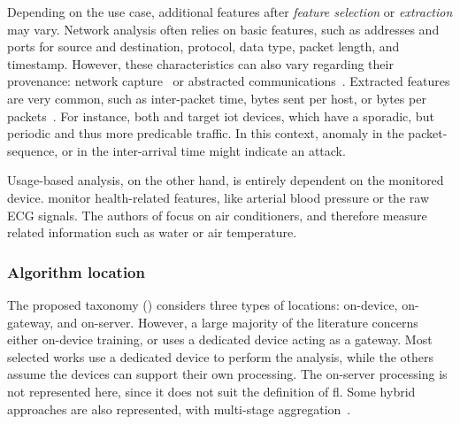 Depending on the use case, additional features after \emph{feature selection} or \emph{extraction} may vary.
Network analysis often relies on basic features, such as addresses and ports for source and destination, protocol, data type, packet length, and timestamp.
However, these characteristics can also vary regarding their provenance: network capture~\cite{kddcup99,tavallaee_detailedanalysisKDD_2009} or abstracted communications~\cite{pahl_AllEyesYou_2018}.
Extracted features are very common, such as inter-packet time, bytes sent per host, or bytes per packets~\cite{buczak_SurveyDataMining_2016,chaabouni_NetworkIntrusionDetection_2019}.
For instance, both \textcite{nguyen_DIoTFederatedSelflearning_2019} and \textcite{pahl_AllEyesYou_2018} target \gls{iot} devices, which have a sporadic, but periodic and thus more predicable traffic.
In this context, anomaly in the packet-sequence, or in the inter-arrival time might indicate an attack.

Usage-based analysis, on the other hand, is entirely dependent on the monitored device.
\textcite{schneble_Attackdetectionusing_2019} monitor health-related features, like arterial blood pressure or the raw ECG signals.
The authors of \cite{zhang_BlockchainbasedFederatedLearning_2020} focus on air conditioners, and therefore measure related information such as water or air temperature.


\subsubsection{Algorithm location\label{sec:sota.quali.location}}

The proposed taxonomy () considers three types of locations: on-device, on-gateway, and on-server.
However, a large majority of the literature concerns either on-device training, or uses a dedicated device acting as a gateway.
Most selected works use a dedicated device to perform the analysis, while the others assume the devices can support their own processing.
The on-server processing is not represented here, since it does not suit the definition of \gls{fl}.
Some hybrid approaches are also represented, with multi-stage aggregation~\cite{liu_BlockchainFederatedLearning_2021}.

